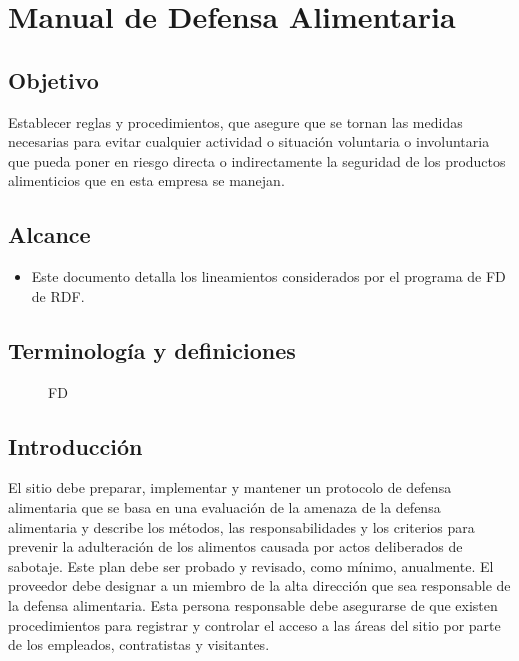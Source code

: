 \thispagestyle{formato-PI}
\renewcommand{\MayorVer}{2}
\renewcommand{\MenorVer}{0}
\renewcommand{\Codigo}{FD-1-MAN}
\renewcommand{\FechaPub}{2023--01}
\renewcommand{\Titulo}{Manual de Defensa Alimentaria}

\section{\Titulo} \label{MAN:FoodDefense}
\subsection{Objetivo}
Establecer reglas y procedimientos, que asegure que se tornan las medidas necesarias para evitar cualquier actividad o situación voluntaria o involuntaria que pueda poner en riesgo directa o indirectamente la seguridad de los productos alimenticios que en esta empresa se manejan.

\subsection{Alcance}
\begin{itemize}
	\item Este documento detalla los lineamientos considerados por el programa de \gls{FD} de \gls{RDF}.
\end{itemize}

\subsection{Terminología y definiciones}
\begin{description}
	\item[] \glsdesc{FD} 
\end{description}

\subsection{Introducción}
El sitio debe preparar, implementar y mantener un protocolo de defensa alimentaria que se basa en una evaluación de la amenaza de la defensa alimentaria y describe los métodos, las responsabilidades y los criterios para prevenir la adulteración de los alimentos causada por actos deliberados de sabotaje. Este plan debe ser probado y revisado, como mínimo,
anualmente. El proveedor debe designar a un miembro de la alta dirección que sea responsable de la defensa alimentaria. Esta persona responsable debe asegurarse de que existen procedimientos para registrar y controlar el acceso a las áreas del sitio por parte de los empleados, contratistas y visitantes.

